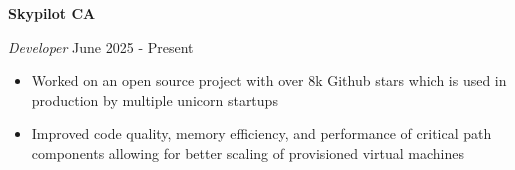 \textbf{Skypilot \hfill CA}\par
\textit{Developer} \hfill June 2025 - Present
\begin{itemize}
	\item Worked on an open source project with over 8k Github stars which is used in production by multiple unicorn startups
        \item Improved code quality, memory efficiency, and performance of critical path components allowing for better scaling of provisioned virtual machines
\end{itemize}\par